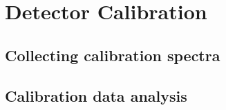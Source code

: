 \chapter{Detector Calibration}

\section{Collecting calibration spectra}

\section{Calibration data analysis}
